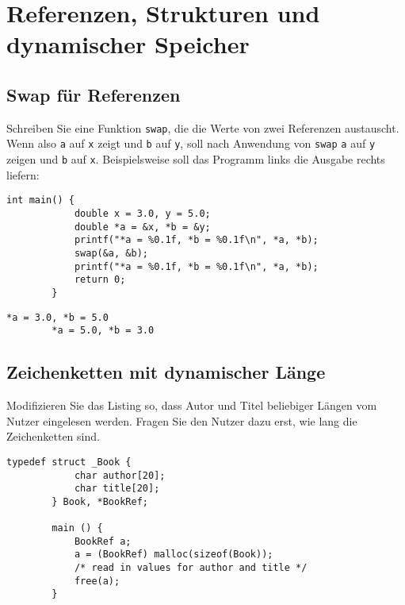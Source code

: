 \documentclass[a4paper]{article}
\begin{document}
	\section{Referenzen, Strukturen und dynamischer Speicher}
	
	\subsection{Swap für Referenzen}
	
	Schreiben Sie eine Funktion \texttt{swap}, die die Werte von zwei Referenzen austauscht.
	Wenn also \texttt{a} auf \texttt{x} zeigt und \texttt{b} auf \texttt{y}, soll nach Anwendung von \texttt{swap} \texttt{a} auf \texttt{y} zeigen und \texttt{b} auf \texttt{x}.
	Beispielsweise soll das Programm links die Ausgabe rechts liefern:

	\noindent\begin{minipage}[t][][b]{0.6\linewidth}
	\begin{lstlisting}[gobble=4]
		int main() {    
			double x = 3.0, y = 5.0;
			double *a = &x, *b = &y;
			printf("*a = %0.1f, *b = %0.1f\n", *a, *b);
			swap(&a, &b);
			printf("*a = %0.1f, *b = %0.1f\n", *a, *b);
			return 0;
		}
	\end{lstlisting}
	\end{minipage}\qquad
	\begin{minipage}[t][][b]{0.3\linewidth}
	\begin{lstlisting}[gobble=4]
		*a = 3.0, *b = 5.0
		*a = 5.0, *b = 3.0
	\end{lstlisting}
	\end{minipage}
	
	\subsection{Zeichenketten mit dynamischer Länge}

	Modifizieren Sie das Listing so, dass Autor und Titel beliebiger Längen vom Nutzer eingelesen werden.
	Fragen Sie den Nutzer dazu erst, wie lang die Zeichenketten sind.
	
	\begin{lstlisting}[gobble=4]
		typedef struct _Book {
			char author[20];
			char title[20];
		} Book, *BookRef;
		
		main () {
			BookRef a;
			a = (BookRef) malloc(sizeof(Book));
			/* read in values for author and title */
			free(a);
		}
	\end{lstlisting}
	
	\clearpage
	
\end{document}
